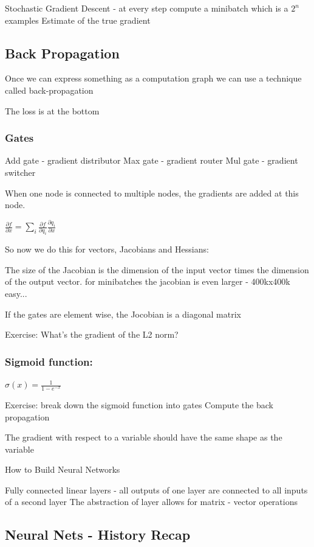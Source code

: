 Stochastic Gradient Descent - at every step compute a minibatch which is a $2^n$ examples
Estimate of the true gradient

\subsection{Back Propagation}
Once we  can express something as a computation graph we can use a technique called back-propagation

The loss is at the bottom

\subsubsection{Gates}
Add gate - gradient distributor 
Max gate - gradient router
Mul gate - gradient switcher

When one node is connected to multiple nodes, the gradients are added at this node.

$\frac{\partial f}{\partial x} = \sum_i \frac{\partial f}{\partial q_i}\frac{\partial q_i}{\partial x} $

So now we do this for vectors, Jacobians and Hessians:

The size of the Jacobian is the dimension of the input vector times the dimension of the output vector. for minibatches the jacobian is even larger - 400kx400k easy... 

If the gates are element wise, the Jocobian is a diagonal matrix

Exercise: What's the gradient of the L2 norm? 

\subsubsection{Sigmoid function:}
$\sigma (x) = \frac{1}{1-e^{-x}}$

Exercise: break down the sigmoid function into gates
Compute the back propagation

The gradient with respect to a variable should have the same shape as the variable

How to Build Neural Networks

Fully connected linear layers - all outputs of one layer are connected to all inputs of a second layer
The abstraction of layer allows for matrix - vector operations


 \subsection{Neural Nets - History Recap}

